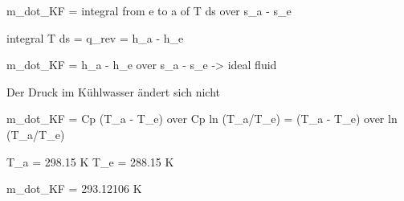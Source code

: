 m_dot_KF = integral from e to a of T ds over s_a - s_e

integral T ds = q_rev = h_a - h_e

m_dot_KF = h_a - h_e over s_a - s_e -> ideal fluid

Der Druck im Kühlwasser ändert sich nicht

m_dot_KF = Cp (T_a - T_e) over Cp ln (T_a/T_e) = (T_a - T_e) over ln (T_a/T_e)

T_a = 298.15 K
T_e = 288.15 K

m_dot_KF = 293.12106 K
